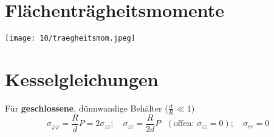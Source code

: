 \section{Flächenträgheitsmomente}
    \begin{center}
    \vspace{-2mm}
        \texttt{[image: 10/traegheitsmom.jpeg]}
    \end{center}
\vspace{-3mm}
\section{Kesselgleichungen}
    Für \textbf{geschlossene}, dünnwandige Behälter ($\frac{d}{R} \ll 1$)
    \vspace{-3mm}
    \[\sigma_{\varphi\varphi} = \frac{R}{d}P = 2\sigma_{zz}; \quad \sigma_{zz} = \frac{R}{2d}P \textrm{ }(\textrm{offen: }\sigma_{zz}=0); \quad \sigma_{rr}=0\]


